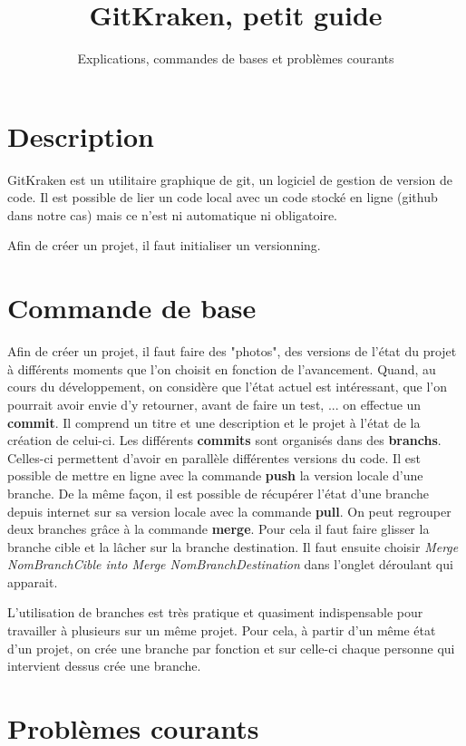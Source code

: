 \documentclass[12pt]{article}
\begin{document}
 
 



\title{GitKraken, petit guide}%
\author{Explications, commandes de bases et problèmes courants} 
\maketitle
\section{Description}
GitKraken est un utilitaire graphique de git, un logiciel de gestion de version de code. Il est possible de lier un code local avec un code stocké en ligne (github dans notre cas) mais ce n'est ni automatique ni obligatoire. 

Afin de créer un projet, il faut initialiser un versionning.

\section{Commande de base}
Afin de créer un projet, il faut faire des "photos", des versions de l'état du projet à différents moments que l'on choisit en fonction de l'avancement. Quand, au cours du développement, on considère que l'état actuel est intéressant, que l'on pourrait avoir envie d'y retourner, avant de faire un test, ... on effectue un \textbf{commit}. Il comprend un titre et une description et le projet à l'état de la création de celui-ci. Les différents \textbf{commits} sont organisés dans des \textbf{branchs}. Celles-ci permettent d'avoir en parallèle différentes versions du code. Il est possible de mettre en ligne avec la commande \textbf{push} la version locale d'une branche. De la même façon, il est possible de récupérer l'état d'une branche depuis internet sur sa version locale avec la commande \textbf{pull}. On peut regrouper deux branches grâce à la commande \textbf{merge}. Pour cela il faut faire glisser la branche cible et la lâcher sur la branche destination. Il faut ensuite choisir \emph{Merge NomBranchCible into Merge NomBranchDestination} dans l'onglet déroulant qui apparait.

L'utilisation de branches est très pratique et quasiment indispensable pour travailler à plusieurs sur un même projet. Pour cela, à partir d'un même état d'un projet, on crée une branche par fonction et sur celle-ci chaque personne qui intervient dessus crée une branche.  
\section{Problèmes courants}
\end{document}
